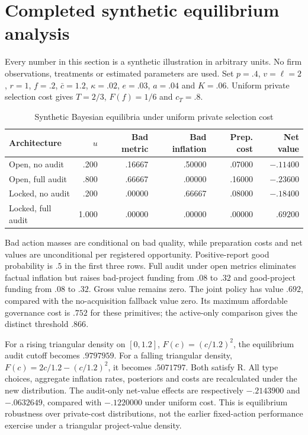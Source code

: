 \documentclass[11pt]{article}
\begin{document}
\section{Completed synthetic equilibrium analysis}\label{sec:numerics}
Every number in this section is a synthetic illustration in arbitrary units. No firm observations, treatments or estimated parameters are used. Set $p=.4$, $v=\ell=2$, $r=1$, $f=.2$, $\bar c=1.2$, $\kappa=.02$, $e=.03$, $a=.04$ and $K=.06$. Uniform private selection cost gives $T=2/3$, $F(f)=1/6$ and $c_T=.8$.
\begin{table}[ht]\centering\small
\caption{Synthetic Bayesian equilibria under uniform private selection cost}
\begin{tabular}{lrrrrr}\toprule
Architecture & $u$ & Bad metric & Bad inflation & Prep. cost & Net value\\\midrule
Open, no audit & .200 & .16667 & .50000 & .07000 & $-.11400$\\
Open, full audit & .800 & .66667 & .00000 & .16000 & $-.23600$\\
Locked, no audit & .200 & .00000 & .66667 & .08000 & $-.18400$\\
Locked, full audit & 1.000 & .00000 & .00000 & .00000 & $.69200$\\\bottomrule
\end{tabular}
\end{table}
Bad action masses are conditional on bad quality, while preparation costs and net values are unconditional per registered opportunity. Positive-report good probability is $.5$ in the first three rows. Full audit under open metrics eliminates factual inflation but raises bad-project funding from $.08$ to $.32$ and good-project funding from $.08$ to $.32$. Gross value remains zero. The joint policy has value $.692$, compared with the no-acquisition fallback value zero. Its maximum affordable governance cost is $.752$ for these primitives; the active-only comparison gives the distinct threshold $.866$.

For a rising triangular density on $[0,1.2]$, $F(c)=(c/1.2)^2$, the equilibrium audit cutoff becomes $.9797959$. For a falling triangular density, $F(c)=2c/1.2-(c/1.2)^2$, it becomes $.5071797$. Both satisfy R. All type choices, aggregate inflation rates, posteriors and costs are recalculated under the new distribution. The audit-only net-value effects are respectively $-.2143900$ and $-.0632649$, compared with $-.1220000$ under uniform cost. This is equilibrium robustness over private-cost distributions, not the earlier fixed-action performance exercise under a triangular project-value density.
\end{document}
